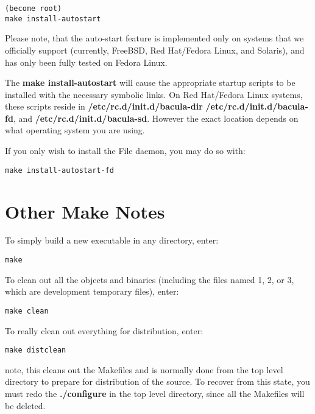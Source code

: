 \footnotesize
\begin{verbatim}
(become root)
make install-autostart
\end{verbatim}
\normalsize

Please note, that the auto-start feature is implemented only on systems
that we officially support (currently, FreeBSD, Red Hat/Fedora Linux, and
Solaris), and has only been fully tested on Fedora Linux.

The {\bf make install-autostart} will cause the appropriate startup scripts
to be installed with the necessary symbolic links.  On Red Hat/Fedora Linux
systems, these scripts reside in {\bf /etc/rc.d/init.d/bacula-dir} {\bf
/etc/rc.d/init.d/bacula-fd}, and {\bf /etc/rc.d/init.d/bacula-sd}.  However
the exact location depends on what operating system you are using.

If you only wish to install the File daemon, you may do so with: 

\footnotesize
\begin{verbatim}
make install-autostart-fd
\end{verbatim}
\normalsize

\section{Other Make Notes}

To simply build a new executable in any directory, enter: 

\footnotesize
\begin{verbatim}
make
\end{verbatim}
\normalsize

To clean out all the objects and binaries (including the files named 1, 2, or
3, which are development temporary files), enter: 

\footnotesize
\begin{verbatim}
make clean
\end{verbatim}
\normalsize

To really clean out everything for distribution, enter: 

\footnotesize
\begin{verbatim}
make distclean
\end{verbatim}
\normalsize

note, this cleans out the Makefiles and is normally done from the top level
directory to prepare for distribution of the source. To recover from this
state, you must redo the {\bf ./configure} in the top level directory, since
all the Makefiles will be deleted. 

